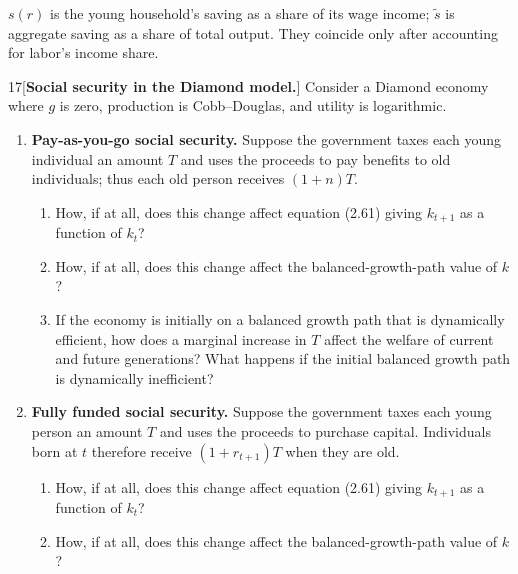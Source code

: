 \begin{note}
    \(s(r)\) is the young household's saving as a share of its wage income;
    \(\widetilde{s}\) is aggregate saving as a share of total output. They
    coincide only after accounting for labor's income share.
\end{note}

\begin{problem}{17}[\textbf{Social security in the Diamond model.}]
Consider a Diamond economy where \(g\) is zero, production is Cobb--Douglas, and utility is logarithmic.
\begin{enumerate}[label=(\alph*)]
    \item \textbf{Pay-as-you-go social security.} Suppose the government taxes each young individual an amount \(T\) and uses the proceeds to pay benefits to old individuals; thus each old person receives \(\left(1+n\right)T\).
    \begin{enumerate}[label=(\roman*)]
        \item How, if at all, does this change affect equation (2.61) giving \(k_{t+1}\) as a function of \(k_t\)?
        \item How, if at all, does this change affect the balanced-growth-path value of \(k\)?
        \item If the economy is initially on a balanced growth path that is dynamically efficient, how does a marginal increase in \(T\) affect the welfare of current and future generations? What happens if the initial balanced growth path is dynamically inefficient?
    \end{enumerate}
    \item \textbf{Fully funded social security.} Suppose the government taxes each young person an amount \(T\) and uses the proceeds to purchase capital. Individuals born at \(t\) therefore receive \(\left(1+r_{t+1}\right)T\) when they are old.
    \begin{enumerate}[label=(\roman*)]
        \item How, if at all, does this change affect equation (2.61) giving \(k_{t+1}\) as a function of \(k_t\)?
        \item How, if at all, does this change affect the balanced-growth-path value of \(k\)?
    \end{enumerate}
\end{enumerate}
\end{problem}


